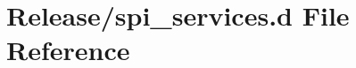 \hypertarget{spi__services_8d}{}\section{Release/spi\+\_\+services.d File Reference}
\label{spi__services_8d}
